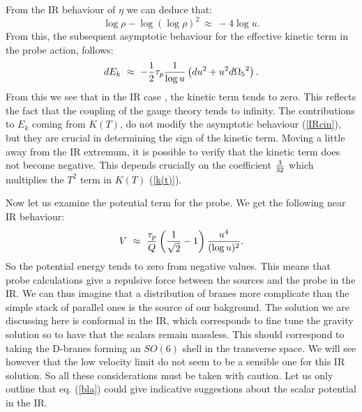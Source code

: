 \documentclass[a4paper,12pt]{article}
\def\half{{1 \over 2}}
\begin{document}
From the IR behaviour of $\eta$ we can deduce that:
\begin{equation}
\log\rho - \log(\log\rho)^2~\approx ~-4\log u.
\end{equation}
From this, the subsequent asymptotic behaviour for the effective kinetic term 
in the probe action, follows:
\begin{equation}
dE_k~\approx~-\half \tau_p {1\over\log u}\left(du^2 + u^2 d{\Omega_5}^2\right).
\label{IRcin}
\end{equation}
From this we see that in the IR case , the kinetic term tends to zero. This
reflects the fact that the coupling of the gauge theory tends to infinity. 
The contributions to $E_k$ coming from $K(T)$, do not modify the asymptotic behaviour 
(\ref{IRcin}), but they are crucial in determining the sign of the kinetic term.
Moving a little away from the IR extremum, it is possible to verify that the kinetic term does not become negative. This depends crucially on 
the coefficient $3\over {32}$ which multiplies the $T^2$ term 
in $K(T)$ (\ref{k(t)}).

Now let us examine the potential term for the probe. We get the following near IR
behaviour:
\begin{equation}
V~\approx~{\tau_p\over Q}\left({1\over\sqrt2} - 1\right){u^4\over(\log u)^2}.
\label{bla} 
\end{equation}
So the potential energy tends to zero from negative values. This means that  
probe calculations give a repulsive force between the sources and the probe in the IR. We can thus imagine that a distribution of branes more complicate than
the simple stack of parallel ones is the source of our bakground. The solution we are discussing here is conformal in the IR, which corresponds to fine tune the gravity solution so to have that the scalars remain massless. This should correspond to taking the D-branes forming an $SO(6)$ shell in the transverse space. We will see however that the low velocity limit do not 
seem to be a sensible one for this IR solution. So all these considerations must be
taken with caution. Let us only outline that eq. (\ref{bla}) could give indicative suggestions about the scalar potential in the IR.
\end{document}
